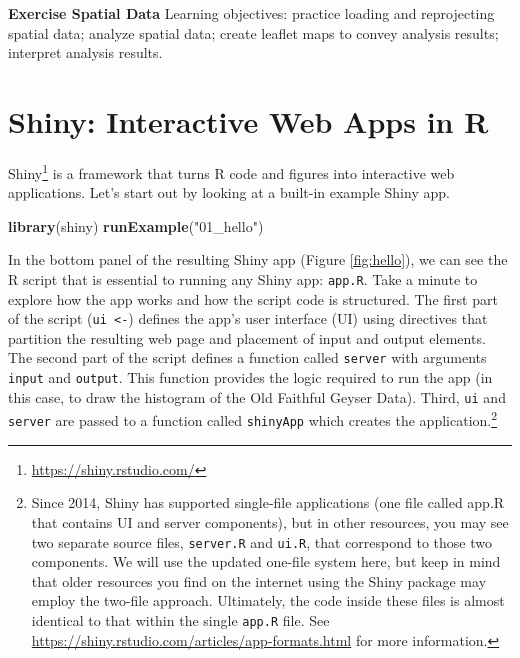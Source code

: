 \documentclass[
]{krantz}
\newenvironment{Shaded}{\begin{snugshade}}{\end{snugshade}}
\newcommand{\KeywordTok}[1]{\textcolor[rgb]{0.13,0.29,0.53}{\textbf{#1}}}
\newcommand{\NormalTok}[1]{#1}
\newcommand{\StringTok}[1]{\textcolor[rgb]{0.31,0.60,0.02}{#1}}
\renewcommand{\href}[2]{#2\footnote{\url{#1}}}
\begin{document}
\textbf{Exercise Spatial Data} Learning objectives: practice loading and reprojecting spatial data; analyze spatial data; create leaflet maps to convey analysis results; interpret analysis results.

\hypertarget{shiny-interactive-web-apps-in-r}{%
\chapter{Shiny: Interactive Web Apps in R}\label{shiny-interactive-web-apps-in-r}}

\href{https://shiny.rstudio.com/}{Shiny} is a framework that turns R code and figures into interactive web applications. Let's start out by looking at a built-in example Shiny app.

\begin{Shaded}
\begin{Highlighting}[]
\KeywordTok{library}\NormalTok{(shiny)}
\KeywordTok{runExample}\NormalTok{(}\StringTok{"01\_hello"}\NormalTok{)}
\end{Highlighting}
\end{Shaded}

In the bottom panel of the resulting Shiny app (Figure \ref{fig:hello}), we can see the R script that is essential to running any Shiny app: \texttt{app.R}. Take a minute to explore how the app works and how the script code is structured. The first part of the script (\texttt{ui\ \textless{}-}) defines the app's user interface (UI) using directives that partition the resulting web page and placement of input and output elements. The second part of the script defines a function called \texttt{server} with arguments \texttt{input} and \texttt{output}. This function provides the logic required to run the app (in this case, to draw the histogram of the Old Faithful Geyser Data). Third, \texttt{ui} and \texttt{server} are passed to a function called \texttt{shinyApp} which creates the application.\footnote{Since 2014, Shiny has supported single-file applications (one file called app.R that contains UI and server components), but in other resources, you may see two separate source files, \texttt{server.R} and \texttt{ui.R}, that correspond to those two components. We will use the updated one-file system here, but keep in mind that older resources you find on the internet using the Shiny package may employ the two-file approach. Ultimately, the code inside these files is almost identical to that within the single \texttt{app.R} file. See \url{https://shiny.rstudio.com/articles/app-formats.html} for more information.}
\end{document}

